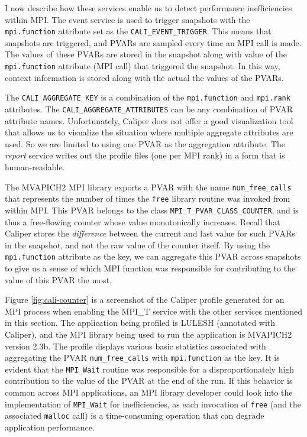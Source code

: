 \par I now describe how these services enable us to detect performance inefficiencies within MPI. The event service is used to trigger snapshots with the \verb+mpi.function+ attribute set as the \verb+CALI_EVENT_TRIGGER+. This means that snapshots are triggered, and PVARs are sampled every time an MPI call is made. The values of these PVARs are stored in the snapshot along with value of the \verb+mpi.function+ attribute (MPI call) that triggered the snapshot. In this way, context information is stored along with the actual the values of the PVARs.
\par The \verb+CALI_AGGREGATE_KEY+ is a combination of the \verb+mpi.function+ and \verb+mpi.rank+ attributes. The \verb+CALI_AGGREGATE_ATTRIBUTES+ can be any combination of PVAR attribute names. Unfortunately, Caliper does not offer a good visualization tool that allows us to visualize the situation where multiple aggregate attributes are used. So we are limited to using one PVAR as the aggregation attribute. The \textit{report} service writes out the profile files (one per MPI rank) in a form that is human-readable.
\par The MVAPICH2 MPI library exports a PVAR with the name \verb+num_free_calls+ that represents the number of times the \verb+free+ library routine was invoked from within MPI. This PVAR belongs to the class \verb+MPI_T_PVAR_CLASS_COUNTER+, and is thus a free-flowing counter whose value monotonically increases. Recall that Caliper stores the \textit{difference} between the current and last value for such PVARs in the snapshot, and not the raw value of the counter itself. By using the \verb+mpi.function+ attribute as the key, we can aggregate this PVAR across snapshots to give us a sense of which MPI function was responsible for contributing to the value of this PVAR the most. 
\par Figure \ref{fig:cali-counter} is a screenshot of the Caliper profile generated for an MPI process when enabling the MPI\_T service with the other services mentioned in this section. The application being profiled is LULESH (annotated with Caliper), and the MPI library being used to run the application is MVAPICH2 version 2.3b. The profile displays various basic statistics associated with aggregating the PVAR \verb+num_free_calls+ with \verb+mpi.function+ as the key. It is evident that the \verb+MPI_Wait+ routine was responsible for a disproportionately high contribution to the value of the PVAR at the end of the run. If this behavior is common across MPI applications, an MPI library developer could look into the implementation of \verb+MPI_Wait+ for inefficiencies, as each invocation of \verb+free+ (and the associated \verb+malloc+ call) is a time-consuming operation that can degrade application performance.


